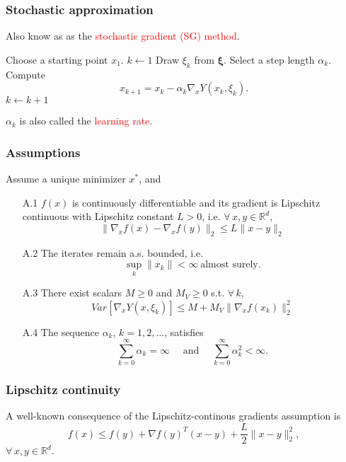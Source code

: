 \documentclass{beamer}
\def\bxi{\boldsymbol\xi}
\def\RR{\mathbb{R}}
\begin{document}
\begin{frame}
\frametitle{Stochastic approximation}

Also know as as the \textcolor{red}{stochastic gradient (SG) method}.

\mbox{}

\begin{algorithmic}
\State Choose a starting point $x_1$.
\State $k \leftarrow 1$
\State Draw $\xi_k$ from $\bxi$.
\State Select a step length $\alpha_k$.
\State Compute
$$
x_{k+1} = x_k - \alpha_k \nabla_x Y(x_k, \xi_k).
$$
\State $k \leftarrow k+1$
\EndWhile
\end{algorithmic}

\mbox{}

$\alpha_k$ is also called the \textcolor{red}{learning rate}.

\end{frame}

\begin{frame}
\frametitle{Assumptions}


Assume a unique minimizer $x^*$, and
\begin{enumerate}
\item[A.1]
$f(x)$ is continuously differentiable and its gradient is Lipschitz continuous with Lipschitz constant $L > 0$, i.e. $\forall\, x, y \in \RR^d$,
$$
\| \nabla_x f(x) - \nabla_x f(y) \|_2 \leq L \| x - y \|_2
$$
\item[A.2]
The iterates remain a.s. bounded, i.e.
$$
\sup_k \| x_k \| < \infty\ \text{almost surely}.
$$
\item[A.3]
There exist scalars $M \geq 0$ and $M_V \geq 0$ s.t. $\forall\, k$,
$$
Var[\nabla_x Y(x, \xi_k)] \leq M + M_V\| \nabla_x f(x_k)\|_2^2
$$
\item[A.4]
The sequence $\alpha_k$, $k=1,2,\ldots$, satisfies
$$
\sum_{k=0}^{\infty}\alpha_k=\infty \quad \mbox{ and } \quad \sum_{k=0}^{\infty}\alpha_k^{2} < \infty.
$$
\end{enumerate}

\end{frame}

\begin{frame}
\frametitle{Lipschitz continuity}

A well-known consequence of the Lipschitz-continous gradients assumption is
$$
f(x) \leq f(y) + \nabla f(y)^T ( x - y ) + \frac{L}{2} \| x - y \|^2_2,
$$
$\forall\, x, y \in \RR^d$.

\end{frame}
\end{document}
